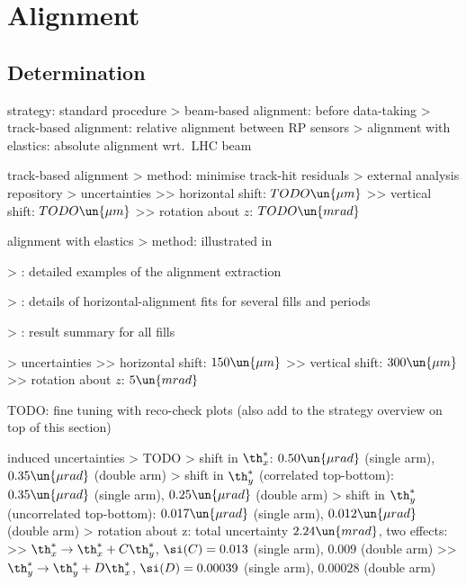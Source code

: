 \chapter[alignment]{Alignment}


\section[alignment-det]{Determination}

\> strategy: standard procedure
\>> beam-based alignment: before data-taking
\>> track-based alignment: relative alignment between RP sensors
\>> alignment with elastics: absolute alignment wrt.~LHC beam

\> track-based alignment
\>> method: minimise track-hit residuals
\>> external analysis repository
\>> uncertainties
\>>> horizontal shift: $TODO\un{\mu m}$
\>>> vertical shift: $TODO\un{\mu m}$
\>>> rotation about $z$: $TODO\un{mrad}$

\> alignment with elastics
\>> method: illustrated in 

\>> : detailed examples of the alignment extraction

\>> : details of horizontal-alignment fits for several fills and periods

\>> : result summary for all fills

\>> uncertainties
\>>> horizontal shift: $150\un{\mu m}$
\>>> vertical shift: $300\un{\mu m}$
\>>> rotation about $z$: $5\un{mrad}$

\> TODO: fine tuning with reco-check plots (also add to the strategy overview on top of this section)

\> induced uncertainties
\>> TODO
\iffalse
\>> shift in $\th_x^*$: $0.50\un{\mu rad}$ (single arm), $0.35\un{\mu rad}$ (double arm)
\>> shift in $\th_y^*$ (correlated top-bottom): $0.35\un{\mu rad}$ (single arm), $0.25\un{\mu rad}$ (double arm)
\>> shift in $\th_y^*$ (uncorrelated top-bottom): $0.017\un{\mu rad}$ (single arm), $0.012\un{\mu rad}$ (double arm)
\>> rotation about z: total uncertainty $2.24\un{mrad}$, two effects:
\>>> $\th_x^* \rightarrow \th_x^* + C \th_y^*$, $\si(C) = 0.013$ (single arm), $0.009$ (double arm)
\>>> $\th_y^* \rightarrow \th_y^* + D \th_x^*$, $\si(D) = 0.00039$ (single arm), $0.00028$ (double arm)

